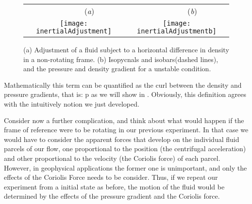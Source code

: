 \begin{figure}[t]
\begin{center}
 \begin{tabular}{cc}
        ~~~~~~~~(\textit{a})                        &   ~~~~~~~~(\textit{b}) \\
    \texttt{[image: inertialAdjustment]}
    & \texttt{[image: inertialAdjustmentb]}

  \end{tabular}
\end{center}
\caption{
(a) Adjustment of a fluid subject to a horizontal difference in density in a non-rotating frame.
(b) Isopycnals and isobars(dashed lines), and the pressure and density gradient for a unstable condition.
        }
\label{f:drivedrag}
\end{figure}

Mathematically this term can be quantified as the curl between the
density and pressure gradients, that is:
\beq
\nabla \rho \times \nabla p
as we will show in . Obviously, this definition
agrees with the intuitively notion we just developed.

Consider now a further complication, and think about what would happen if
the frame of reference were to be rotating in our previous experiment. In
that case we would have to consider the apparent forces that develop on
the individual fluid parcels of our flow, one proportional to the
position (the centrifugal acceleration) and other proportional to the
velocity (the Coriolis force) of each parcel. However, in geophysical
applications the former one is unimportant, and only the
effects of the Coriolis Force needs to be consider. Thus, if we repeat
our experiment from a initial state as before, the motion of the fluid
would be determined by the effects of the pressure gradient and the
Coriolis force.

